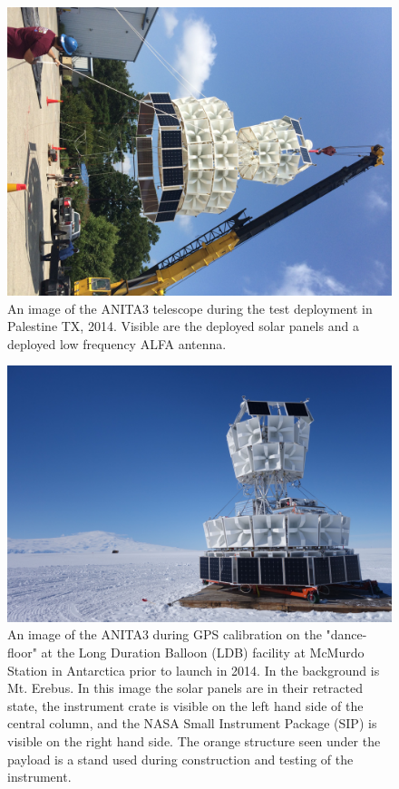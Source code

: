 	
\begin{figure}
\centering
	\includegraphics[height=0.9\textheight]{figures/ANITA3_hangtest}
	\caption{An image of the ANITA3 telescope during the test deployment in Palestine TX, 2014.  Visible are the deployed solar panels and a deployed low frequency ALFA antenna.}
	\label{fig:ANITA3_hangtest}
\end{figure}

\begin{figure}
\centering
	\includegraphics[width=\textwidth]{figures/ANITA3_dancefloor}
	\caption{An image of the ANITA3 during GPS calibration on the "dance-floor" at the Long Duration Balloon (LDB) facility at McMurdo Station in Antarctica prior to launch in 2014.  In the background is Mt. Erebus.  In this image the solar panels are in their retracted state, the instrument crate is visible on the left hand side of the central column, and the NASA Small Instrument Package (SIP) is visible on the right hand side. The orange structure seen under the payload is a stand used during construction and testing of the instrument.}
	\label{fig:ANITA3_dancefloor}
\end{figure}


